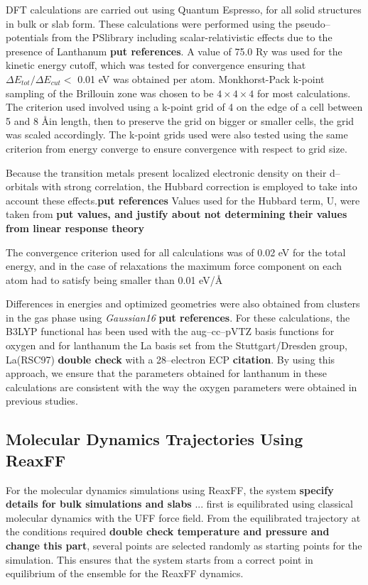 \documentclass[journal=jpcafh,manuscript=article]{achemso}
\begin{document}
DFT calculations are carried out using Quantum Espresso,\cite{giannozzi_advanced_2017} for all solid structures in bulk or slab form.
These calculations were performed using the pseudo--potentials from the PSlibrary including scalar-relativistic effects due to the presence of Lanthanum \textbf{put references}.
A value of 75.0 Ry was used for the kinetic energy cutoff, which was tested for convergence ensuring that $\Delta E_{tot} / \Delta E_{cut} <$ 0.01 eV was obtained per atom.
Monkhorst-Pack k-point sampling of the Brillouin zone was chosen to be $4\times4\times4$ for most calculations.
The criterion used involved using a k-point grid of 4 on the edge of a cell between 5 and 8 \AA in length, then to preserve the grid on bigger or smaller cells, the grid was scaled accordingly.
The k-point grids used were also tested using the same criterion from energy converge to ensure convergence with respect to grid size.

Because the transition metals present localized electronic density on their d--orbitals with strong correlation, the Hubbard correction is employed to take into account these effects.\textbf{put references}
Values used for the Hubbard term, U, were taken from \textbf{put values, and justify about not determining their values from linear response theory}

The convergence criterion used for all calculations was of 0.02 eV for the total energy, and in the case of relaxations the maximum force component on each atom had to satisfy being smaller than 0.01 eV/\AA 

Differences in energies and optimized geometries were also obtained from clusters in the gas phase using \emph{Gaussian16} \textbf{put references}.
For these calculations, the B3LYP functional has been used with the aug--cc--pVTZ basis functions for oxygen and for lanthanum the La basis set from the Stuttgart/Dresden group, La(RSC97) \textbf{double check} with a 28--electron ECP \textbf{citation}.
By using this approach, we ensure that the parameters obtained for lanthanum in these calculations are consistent with the way the oxygen parameters were obtained in previous studies.

\subsection{Molecular Dynamics Trajectories Using ReaxFF}

For the molecular dynamics simulations using ReaxFF, the system \textbf{specify details for bulk simulations and slabs} ... first is equilibrated using classical molecular dynamics with the UFF force field.
From the equilibrated trajectory at the conditions required \textbf{double check temperature and pressure and change this part}, several points are selected randomly as starting points for the simulation.
This ensures that the system starts from a correct point in equilibrium of the ensemble for the ReaxFF dynamics.
\end{document}
